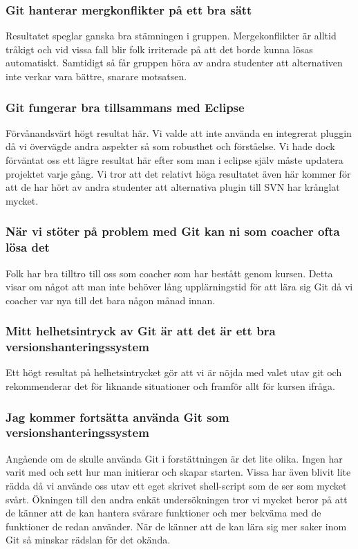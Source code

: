 \subsubsection{Git hanterar mergkonflikter på ett bra sätt}

Resultatet speglar ganska bra stämningen i gruppen. Mergekonflikter är alltid tråkigt och vid vissa fall blir folk irriterade på att det borde kunna lösas automatiskt. Samtidigt så får gruppen höra av andra studenter att alternativen inte verkar vara bättre, snarare motsatsen.  

\subsubsection{Git fungerar bra tillsammans med Eclipse}

Förvånandsvärt högt resultat här. Vi valde att inte använda en integrerat pluggin då vi övervägde andra aspekter så som robusthet och förståelse. Vi hade dock förväntat oss ett lägre resultat här efter som man i eclipse själv måste updatera projektet varje gång. Vi tror att det relativt höga resultatet även här kommer för att de har hört av andra studenter att alternativa plugin till SVN har krånglat mycket. 

\subsubsection{När vi stöter på problem med Git kan ni som coacher ofta lösa det}

Folk har bra tilltro till oss som coacher som har bestått genom kursen. Detta visar om något att man inte behöver lång upplärningstid för att lära sig Git då vi coacher var nya till det bara någon månad innan. 

\subsubsection{Mitt helhetsintryck av Git är att det är ett bra versionshanteringssystem}

Ett högt resultat på helhetsintrycket gör att vi är nöjda med valet utav git och rekommenderar det för liknande situationer och framför allt för kursen ifråga. 

\subsubsection{Jag kommer fortsätta använda Git som versionshanteringssystem}

Angående om de skulle använda Git i forstättningen är det lite olika. Ingen har varit med och sett hur man initierar och skapar starten. Vissa har även blivit lite rädda då vi använde oss utav ett eget skrivet shell-script som de ser som mycket svårt. Ökningen till den andra enkät undersökningen tror vi mycket beror på att de känner att de kan hantera svårare funktioner och mer bekväma med de funktioner de redan använder. När de känner att de kan lära sig mer saker inom Git så minskar rädslan för det okända. 
